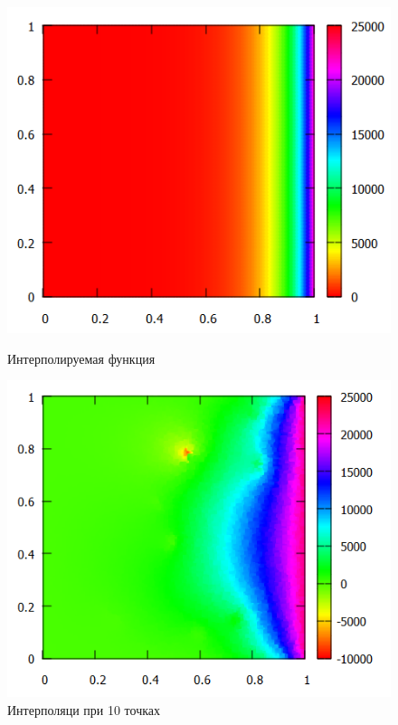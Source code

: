 \documentclass[14pt, a4paper]{extarticle}
\begin{document}
\begin{enumerate}
			\begin{figure}[H]
				\begin{minipage}{0.5\textwidth}
					\centering
					\includegraphics[width = \linewidth]{../4func/orig.png}
					\caption[.] {Интерполируемая функция}
				\end{minipage}\hfill
				\begin{minipage}{0.5\textwidth}
					\centering
					\includegraphics[width = \linewidth]{../4func/M=10T=5774Err=0.640972.png}
					\caption[.] {Интерполяци при 10 точках}
				\end{minipage}\hfill

\end{figure}
\end{enumerate}
\end{document}
